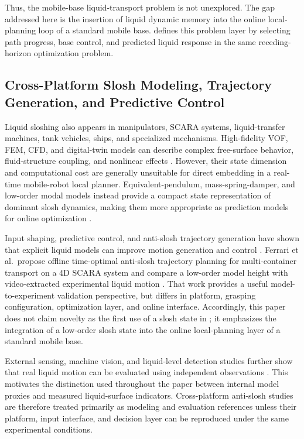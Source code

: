 Thus, the mobile-base liquid-transport problem is not unexplored.
The gap addressed here is the insertion of liquid dynamic memory into the online local-planning loop of a standard mobile base.
\SMPCC{} defines this problem layer by selecting path progress, base control, and predicted liquid response in the same receding-horizon optimization problem.

\subsection{Cross-Platform Slosh Modeling, Trajectory Generation, and Predictive Control}

Liquid sloshing also appears in manipulators, SCARA systems, liquid-transfer machines, tank vehicles, ships, and specialized mechanisms.
High-fidelity VOF, FEM, CFD, and digital-twin models can describe complex free-surface behavior, fluid-structure coupling, and nonlinear effects \cite{A03_Schrgenhumer2019,A04_Elahi2015,A05_Nicolsen2017,A06_Moya2020}.
However, their state dimension and computational cost are generally unsuitable for direct embedding in a real-time mobile-robot local planner.
Equivalent-pendulum, mass-spring-damper, and low-order modal models instead provide a compact state representation of dominant slosh dynamics, making them more appropriate as prediction models for online optimization \cite{A02_Guagliumi2021,A01_Leva2021}.

Input shaping, predictive control, and anti-slosh trajectory generation have shown that explicit liquid models can improve motion generation and control \cite{A07_Singer1990,A12_Okatsuka2011,C05_Okatsuka2012,C01_Ferrari2026,C02_Muchacho2022,C03_Moriello2018,C04_Kuriyama2008,C06_Viet2024}.
Ferrari et al.\ propose offline time-optimal anti-slosh trajectory planning for multi-container transport on a 4D SCARA system and compare a low-order model height with video-extracted experimental liquid motion \cite{C01_Ferrari2026}.
That work provides a useful model-to-experiment validation perspective, but differs in platform, grasping configuration, optimization layer, and online interface.
Accordingly, this paper does not claim novelty as the first use of a slosh state in \MPC{}; it emphasizes the integration of a low-order slosh state into the online local-planning layer of a standard mobile base.

External sensing, machine vision, and liquid-level detection studies further show that real liquid motion can be evaluated using independent observations \cite{A08_Weaver2024,A09_Bobovnik2021,A10_Shao2026,A11_Ren2024}.
This motivates the distinction used throughout the paper between internal model proxies and measured liquid-surface indicators.
Cross-platform anti-slosh studies are therefore treated primarily as modeling and evaluation references unless their platform, input interface, and decision layer can be reproduced under the same experimental conditions.

